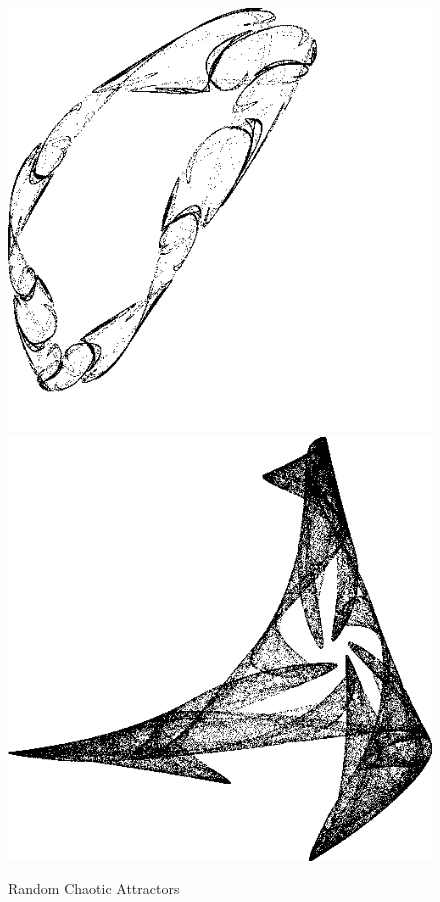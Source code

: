 \documentclass[12pt]{article}
\begin{document}
\begin{figure}[H]
    \includegraphics[width=0.47\linewidth]{Figures/random_attractors/76507.png}
    \includegraphics[width=0.47\linewidth]{Figures/random_attractors/78151.png}
    \caption{Random Chaotic Attractors}
    \label{fig:random chaotic attractors}
\end{figure}

\newpage
\end{document}
